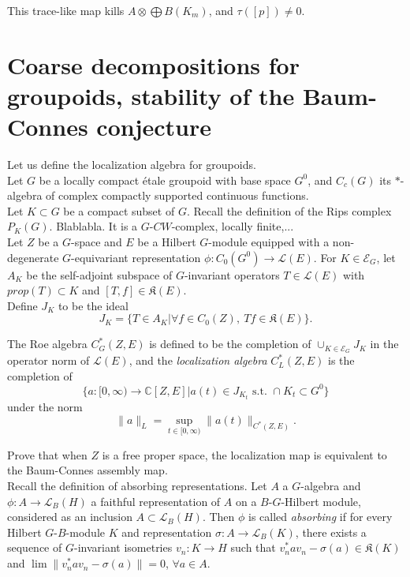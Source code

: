 This trace-like map kills $A \otimes \bigoplus B(K_m) $, and $\tau([p])\neq 0$.\\

\newpage
\section{Coarse decompositions for groupoids, stability of the Baum-Connes conjecture}

Let us define the localization algebra for groupoids.\\

Let $G$ be a locally compact \'etale groupoid with base space $G^0$, and $C_c(G)$ its $*$-algebra of complex compactly supported continuous functions.\\

Let $K\subset G$ be a compact subset of $G$. Recall the definition of the Rips complex $P_K(G)$. Blablabla. It is a $G$-$CW$-complex, locally finite,...\\

Let $Z$ be a $G$-space and $E$ be a Hilbert $G$-module equipped with a non-degenerate $G$-equivariant representation $\phi: C_0(G^0)\rightarrow \mathcal L(E)$. For $K\in \mathcal E_G$, let $A_K$ be the self-adjoint subspace of $G$-invariant operators $T\in \mathcal L(E)$ with $prop(T)\subset K$ and $[T,f]\in \mathfrak K(E)$.\\
 
Define $J_K$ to be the ideal
\[J_K = \{ T\in A_K | \forall f\in C_0(Z), \ Tf \in \mathfrak K(E)\}. \]

\begin{definition}
The Roe algebra $C^*_G(Z,E)$ is defined to be the completion of $\cup_{K\in \mathcal E_G} J_K$ in the operator norm of $\mathcal L(E)$, and the \textit{localization algebra} $C^*_L(Z,E)$ is the completion of 
\[\{a: [0,\infty ) \rightarrow \mathbb C[Z,E] | a(t)\in J_{K_t} \text{ s.t. } \cap K_t \subset G^0\}\]
under the norm
\[\|a\|_L = \sup_{t\in [0,\infty)} \| a(t)\|_{C^*(Z,E)}.\] 
\end{definition}
 
Prove that when $Z$ is a free proper space, the localization map is equivalent to the Baum-Connes assembly map.\\

Recall the definition of absorbing representations. Let $A$ a $G$-algebra and $\phi: A\rightarrow \mathcal L_B(H)$ a faithful representation of $A$ on a $B$-$G$-Hilbert module, considered as an inclusion $A\subset \mathcal L_B(H)$. Then $\phi$ is called \textit{absorbing} if for every Hilbert $G$-$B$-module $K$ and representation $\sigma: A\rightarrow \mathcal L_B(K)$, there exists a sequence of $G$-invariant isometries $v_n : K\rightarrow H$ such that $v_n^* a v_n - \sigma (a)\in \mathfrak K(K)$ and $\lim \|v_n^* a v_n - \sigma (a) \| = 0$, $\forall a\in A$.\\

